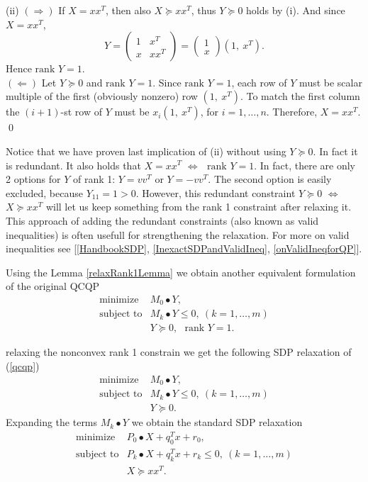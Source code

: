 \documentclass[12pt]{book}
\theoremstyle{definition}
\begin{document}
(ii) $(\Rightarrow)$ If $X=xx^T$, then also $X\succeq xx^T$, thus $Y\succeq 0$ holds by (i). And since $X=xx^T$,
$$Y=\left(
\begin{array}{cc}
1 & x^T\\
x & xx^T
\end{array}\right)
=  \left(\begin{array}{c}
1\\
x
\end{array}\right)
(1,\ x^T).
$$
Hence $\mbox{rank } Y=1$.\\
$(\Leftarrow)$ Let $Y\succeq 0$ and $\mbox{rank } Y=1$. Since $\mbox{rank } Y=1$, each row of $Y$ must be scalar multiple of the first (obviously nonzero) row $(1,\ x^T)$. To match the first column the $(i+1)$-st row of $Y$ must be $x_i(1,\ x^T)$, for $i=1,\dots , n$.
Therefore, $X=xx^T.$
\qed

\rem Notice that we have proven last implication of (ii) without using $Y\succeq 0$. In fact it is redundant. It also holds that $X=xx^T$ $\Leftrightarrow$ $\mbox{ rank } Y=1$. In fact, there are only 2 options for $Y$ of rank 1: $Y = vv^T$ or $Y = -vv^T$. The second option is easily excluded, because $Y_{11}=1>0$. However, this redundant constraint $Y\succeq 0$ $\Leftrightarrow$ $X\succeq xx^T$ will 
let us keep something from the rank 1 constraint after relaxing it. This approach of adding the redundant constraints (also known as valid inequalities) is often usefull for strengthening the relaxation. For more on valid inequalities see [\ref{HandbookSDP}, \ref{InexactSDPandValidIneq}, \ref{onValidIneqforQP}].




Using the Lemma \ref{relaxRank1Lemma} we obtain another equivalent formulation of the original QCQP
\begin{equation} 
\label{3rdStepToSDPr}
\begin{array}{ll}
\mbox{minimize}& M_0\bullet Y ,\\
\mbox{subject to}& M_k\bullet Y \leq 0, \  (k = 1,\dots ,m)\\
& Y\succeq 0, \ \ \ \mbox{rank }Y = 1.
\end{array} 
\end{equation}

 relaxing the nonconvex rank 1 constrain we get the following SDP relaxation of (\ref{qcqp})
\begin{equation} 
\label{SDPrelax1}
\begin{array}{ll}
\mbox{minimize}& M_0\bullet Y, \\
\mbox{subject to}& M_k\bullet Y \leq 0, \  (k = 1,\dots ,m)\\
& Y\succeq 0.
\end{array} 
\end{equation}
Expanding the terms $M_k\bullet Y$ we obtain the standard SDP relaxation
\begin{equation}
\label{SDPrelax2} 
\begin{array}{ll}
\mbox{minimize}& P_0\bullet X + q_0^Tx + r_0,\\
\mbox{subject to}& P_k\bullet X+ q_k^Tx + r_k \leq 0, \  (k = 1,\dots ,m)\\
& X\succeq xx^T.
\end{array} 
\end{equation}
\end{document}
